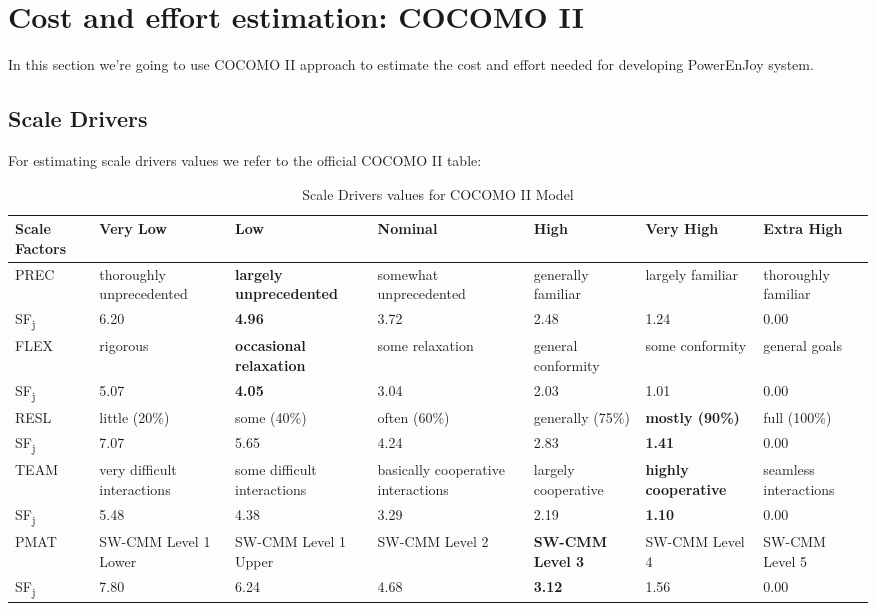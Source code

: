 \section{Cost and effort estimation: COCOMO II}
In this section we’re going to use COCOMO II approach to estimate the cost and effort needed for developing PowerEnJoy system.

\subsection{Scale Drivers}
For estimating scale drivers values we refer to the official COCOMO II table:

\begin{table}[H]
	\begin{adjustwidth}{-.5in}{-.5in}
		\caption[Scale Drivers values]{Scale Drivers values for COCOMO II Model}
		\label{table:scale_drivers}
		\begin{tabularx}{1.25\textwidth}{| X | X | X | X | X | X | X |}
			\hline
			Scale Factors	&	Very Low	&	Low	&	Nominal	&	High	&	Very High	&	Extra High \\ \hline
			
			PREC	&	thoroughly unprecedented	&	\textbf{largely unprecedented}	&	somewhat unprecedented	&	generally familiar	&	largely familiar	&	thoroughly familiar \\
			SF\textsubscript{j}	&	6.20	&	\textbf{4.96}	&	3.72	&	2.48	&	1.24	&	0.00 \\ \hline
			
			FLEX	&	rigorous	&	\textbf{occasional relaxation}	&	some relaxation	&	general conformity	&	some conformity	&	general goals \\
			SF\textsubscript{j}	&	5.07	&	\textbf{4.05}	&	3.04	&	2.03	&	1.01	&	0.00 \\ \hline
			
			RESL	&	little (20\%)	&	some (40\%)	&	often (60\%)	&	generally (75\%)	&	\textbf{mostly (90\%)	}&	full (100\%) \\
			SF\textsubscript{j}	&	7.07	&	5.65	&	4.24	&	2.83	&	\textbf{1.41}	&	0.00 \\ \hline
			
			TEAM	&	very difficult interactions	&	some difficult interactions	&	basically cooperative interactions	&	largely cooperative	&	\textbf{highly cooperative}	&	seamless interactions \\
			SF\textsubscript{j}	&	5.48	&	4.38&	3.29	&	2.19	&	\textbf{1.10}	&	0.00 \\ \hline
			
			PMAT	&	SW-CMM Level 1 Lower	&	SW-CMM Level 1 Upper	&	SW-CMM Level 2	&	\textbf{SW-CMM Level 3}	&	SW-CMM Level 4	&	SW-CMM Level 5 \\
			SF\textsubscript{j}	&	7.80	&	6.24	&	4.68	&	\textbf{3.12}	&	1.56	&	0.00 \\ \hline
		\end{tabularx}
	\end{adjustwidth}
\end{table}


